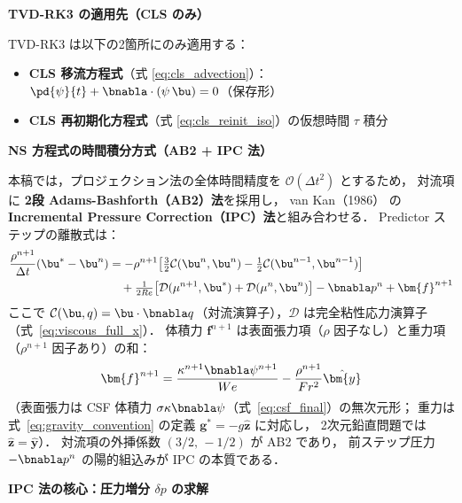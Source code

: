 \begin{tcolorbox}[warnbox, title={TVD-RK3 の適用範囲と全体時間精度}]
\label{warn:tvd_rk3_scope}
\textbf{TVD-RK3 の適用先（CLS のみ）}

TVD-RK3 は以下の2箇所にのみ適用する：
\begin{itemize}
  \item \textbf{CLS 移流方程式}（式 \eqref{eq:cls_advection}）：$\pd{\psi}{t} + \bnabla\cdot(\psi\,\bu) = 0$（保存形）
  \item \textbf{CLS 再初期化方程式}（式 \eqref{eq:cls_reinit_iso}）の仮想時間 $\tau$ 積分
\end{itemize}

\medskip
\noindent\textbf{NS 方程式の時間積分方式（AB2 + IPC 法）}

本稿では，プロジェクション法の全体時間精度を $\mathcal{O}(\Delta t^2)$ とするため，
対流項に \textbf{2段 Adams-Bashforth（AB2）法}を採用し，
van Kan（1986）\cite{vanKan1986} の \textbf{Incremental Pressure Correction（IPC）法}と組み合わせる．
Predictor ステップの離散式は：
\begin{equation}
\begin{split}
  \frac{\rho^{n+1}}{\Delta t}(\bu^* - \bu^n)
  &= -\rho^{n+1}\!\left[\tfrac{3}{2}\mathcal{C}(\bu^n,\bu^n)
    - \tfrac{1}{2}\mathcal{C}(\bu^{n-1},\bu^{n-1})\right] \\
  &\quad + \tfrac{1}{2Re}\bigl[\mathcal{D}(\mu^{n+1},\bu^*)
    + \mathcal{D}(\mu^n,\bu^n)\bigr]
  - \bnabla p^n
  + \bm{f}^{n+1}
\end{split}
  \label{eq:predictor_ab2_ipc}
\end{equation}
ここで $\mathcal{C}(\bu,q) = \bu\cdot\bnabla q$（対流演算子），$\mathcal{D}$ は完全粘性応力演算子
（式~\eqref{eq:viscous_full_x}）．
体積力 $\bm{f}^{n+1}$ は表面張力項（$\rho$ 因子なし）と重力項（$\rho^{n+1}$ 因子あり）の和：
\begin{equation*}
  \bm{f}^{n+1} = \frac{\kappa^{n+1}\bnabla\psi^{n+1}}{We}
                - \frac{\rho^{n+1}}{Fr^2}\hat{\bm{y}}
\end{equation*}
（表面張力は CSF 体積力 $\sigma\kappa\bnabla\psi$（式~\eqref{eq:csf_final}）の無次元形；
重力は式~\eqref{eq:gravity_convention} の定義 $\bm{g}^* = -g\hat{\bm{z}}$ に対応し，
2次元鉛直問題では $\hat{\bm{z}} = \hat{\bm{y}}$）．
対流項の外挿係数 $(3/2,\,-1/2)$ が AB2 であり，
前ステップ圧力 $-\bnabla p^n$ の陽的組込みが IPC の本質である．

\medskip
\noindent\textbf{IPC 法の核心：圧力増分 $\delta p$ の求解}%
\label{sec:ipc_derivation}


\end{tcolorbox}
